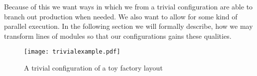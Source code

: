 Because of this we want ways in which we from a trivial configuration are able to branch out production when needed. We also want to allow for some kind of parallel execution.  In the following section we will formally describe, how we may transform lines of modules so that our configurations gains these qualities.


\begin{figure}[h]
\centering
\texttt{[image: trivialexample.pdf]}
\caption{A trivial configuration of a toy factory layout}
\label{fig:trivial-example}
\end{figure}






